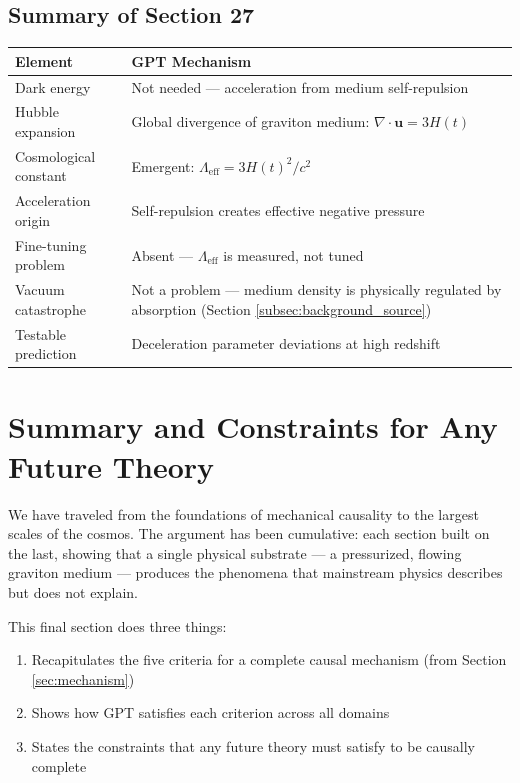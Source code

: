 \documentclass[12pt, a4paper]{article}
\begin{document}
\subsection{Summary of Section 27}
\label{subsec:summary_27}

\begin{center}
\begin{tabular}{|p{4cm}|p{10cm}|}
\hline
\textbf{Element} & \textbf{GPT Mechanism} \\
\hline
Dark energy & Not needed — acceleration from medium self-repulsion \\
\hline
Hubble expansion & Global divergence of graviton medium: \( \nabla \cdot \mathbf{u} = 3H(t) \) \\
\hline
Cosmological constant & Emergent: \( \Lambda_{\text{eff}} = 3H(t)^2/c^2 \) \\
\hline
Acceleration origin & Self-repulsion creates effective negative pressure \\
\hline
Fine-tuning problem & Absent — \( \Lambda_{\text{eff}} \) is measured, not tuned \\
\hline
Vacuum catastrophe & Not a problem — medium density is physically regulated by absorption (Section \ref{subsec:background_source}) \\
\hline
Testable prediction & Deceleration parameter deviations at high redshift \\
\hline
\end{tabular}
\end{center}

\section{Summary and Constraints for Any Future Theory}
\label{sec:summary_constraints}

We have traveled from the foundations of mechanical causality to the largest scales of the cosmos. The argument has been cumulative: each section built on the last, showing that a single physical substrate — a pressurized, flowing graviton medium — produces the phenomena that mainstream physics describes but does not explain.

This final section does three things:
\begin{enumerate}
    \item Recapitulates the five criteria for a complete causal mechanism (from Section \ref{sec:mechanism})
    \item Shows how GPT satisfies each criterion across all domains
    \item States the constraints that any future theory must satisfy to be causally complete
\end{enumerate}
\end{document}
